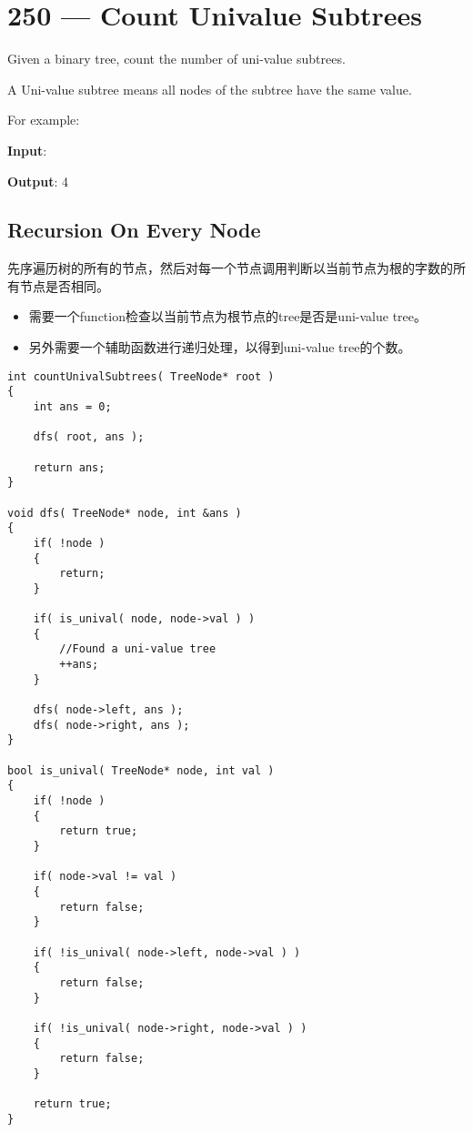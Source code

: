 \section{250 --- Count Univalue Subtrees}
Given a binary tree, count the number of uni-value subtrees.
\par
A Uni-value subtree means all nodes of the subtree have the same value.
\par
For example:
\begin{flushleft}
\textbf{Input}:
\begin{figure}[H]
\end{figure}
\textbf{Output}: 4
\end{flushleft}
\subsection{Recursion On Every Node}
先序遍历树的所有的节点，然后对每一个节点调用判断以当前节点为根的字数的所有节点是否相同。
\begin{itemize}
\item 需要一个function检查以当前节点为根节点的tree是否是uni-value tree。
\item 另外需要一个辅助函数进行递归处理，以得到uni-value tree的个数。
\end{itemize}


\setcounter{lstlisting}{0}
\begin{lstlisting}[style=customc, caption={Recursive On Each NOde}]
int countUnivalSubtrees( TreeNode* root )
{
    int ans = 0;

    dfs( root, ans );

    return ans;
}

void dfs( TreeNode* node, int &ans )
{
    if( !node )
    {
        return;
    }

    if( is_unival( node, node->val ) )
    {
        //Found a uni-value tree
        ++ans;
    }

    dfs( node->left, ans );
    dfs( node->right, ans );
}

bool is_unival( TreeNode* node, int val )
{
    if( !node )
    {
        return true;
    }

    if( node->val != val )
    {
        return false;
    }

    if( !is_unival( node->left, node->val ) )
    {
        return false;
    }

    if( !is_unival( node->right, node->val ) )
    {
        return false;
    }

    return true;
}
\end{lstlisting}
